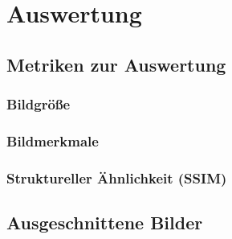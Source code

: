 \chapter{Auswertung}

\section{Metriken zur Auswertung}
\subsection{Bildgröße}
\subsection{Bildmerkmale}
\subsection{Struktureller Ähnlichkeit (SSIM)}

\section{Ausgeschnittene Bilder}

